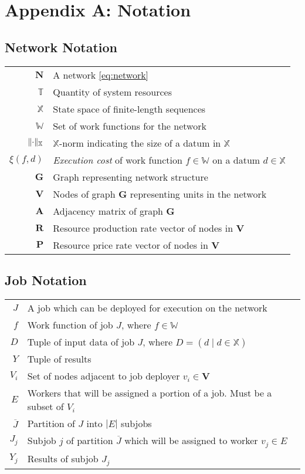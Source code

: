 \documentclass[../mthe-493-project-proposal.tex]{subfiles}
\begin{document}
    \chapter{Appendix A: Notation}
    \label{ap:notation}
    \section*{Network Notation}
    \begin{tabular}{rl}
    \(\mathbf{N}\) & A network \eqref{eq:network} \\
    \(\mathbb{T}\) & Quantity of system resources \\
    \(\mathbb{X}\) & State space of finite-length sequences \\
    \(\mathbb{W}\) & Set of work functions for the network \\
    \(\lVert\cdot\rVert_{\mathbb{X}}\) & \(\mathbb{X}\)-norm indicating the size of a datum in \(\mathbb{X}\) \\
    \(\xi(f, d)\) & \textit{Execution cost} of work function \(f \in \mathbb{W}\) on a datum \(d \in \mathbb{X}\) \\
    \(\mathbf{G}\) & Graph representing network structure \\
    \(\mathbf{V}\) & Nodes of graph \(\mathbf{G}\) representing units in the network \\
    \(\mathbf{A}\) & Adjacency matrix of graph \(\mathbf{G}\) \\
    \(\mathbf{R}\) & Resource production rate vector of nodes in \(\mathbf{V}\) \\
    \(\mathbf{P}\) & Resource price rate vector of nodes in \(\mathbf{V}\) \\
    \end{tabular}
    
    \section*{Job Notation}
    \begin{tabular}{rl}
    \(J\) & A job which can be deployed for execution on the network \\
    \(f\) & Work function of job \(J\), where \(f \in \mathbb{W}\) \\
    \(D\) & Tuple of input data of job \(J\), where \(D = (d \mid d \in \mathbb{X})\) \\
    \(Y\) & Tuple of results \\
    \(V_i\) & Set of nodes adjacent to job deployer \(v_i \in \mathbf{V}\) \\
    \(E\) & Workers that will be assigned a portion of a job. Must be a subset of \(V_i\) \\
    \(\overline{J}\) & Partition of \(J\) into \(|E|\) subjobs \\
    \(J_j\) & Subjob \(j\) of partition \(\overline{J}\) which will be assigned to worker \(v_j \in E\) \\
    \(Y_j\) & Results of subjob \(J_j\) \\
    \end{tabular}
    
\end{document}
